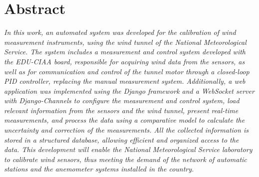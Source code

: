 \chapter*{Abstract}
\textit{In this work, an automated system was developed for the calibration of wind measurement instruments, using the wind tunnel of the National Meteorological Service. The system includes a measurement and control system developed with the EDU-CIAA board, responsible for acquiring wind data from the sensors, as well as for communication and control of the tunnel motor through a closed-loop PID controller, replacing the manual measurement system. Additionally, a web application was implemented using the Django framework and a WebSocket server with Django-Channels to configure the measurement and control system, load relevant information from the sensors and the wind tunnel, present real-time measurements, and process the data using a comparative model to calculate the uncertainty and correction of the measurements. All the collected information is stored in a structured database, allowing efficient and organized access to the data. This development will enable the National Meteorological Service laboratory to calibrate wind sensors, thus meeting the demand of the network of automatic stations and the anemometer systems installed in the country.}